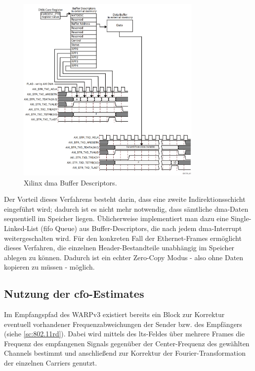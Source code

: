 \documentclass[letterpaper,11pt,ngerman]{article}
\begin{document}
\begin{onehalfspace}
\begin{figure}
\centering
\includegraphics[width=0.8\textwidth]{ds759_axi_ethernet_075.png}
\caption{Xilinx \ac{dma} Buffer Descriptors\autocite{xilinx-ethernet-core}.}
\label{fig:dma}
\end{figure}

Der Vorteil dieses Verfahrens besteht darin, dass eine zweite
Indirektionsschicht eingeführt wird; dadurch ist es nicht mehr
notwendig, dass sämtliche \ac{dma}-Daten sequentiell im Speicher liegen.
Üblicherweise implementiert man dazu eine Single-Linked-List (\ac{fifo}
Queue) aus Buffer-Descriptors, die nach jedem \ac{dma}-Interrupt
weitergeschalten wird. Für den konkreten Fall der Ethernet-Frames
ermöglicht dieses Verfahren, die einzelnen Header-Bestandteile
unabhängig im Speicher ablegen zu können. Dadurch ist ein echter
Zero-Copy Modus - also ohne Daten kopieren zu müssen - möglich.

\subsection{Nutzung der \ac{cfo}-Estimates}
\label{nutzung-der--estimates}

Im Empfangspfad des WARPv3 existiert bereits ein Block zur Korrektur
eventuell vorhandener Frequenzabweichungen der Sender bzw. des
Empfängers (siehe \cref{sc:802.11rd}). Dabei wird
mittels des \ac{lts}-Feldes über mehrere Frames die Frequenz des
empfangenen Signals gegenüber der Center-Frequenz des gewählten Channels
bestimmt und anschließend zur Korrektur der Fourier-Transformation der
einzelnen Carriers genutzt.


\end{onehalfspace}
\end{document}
